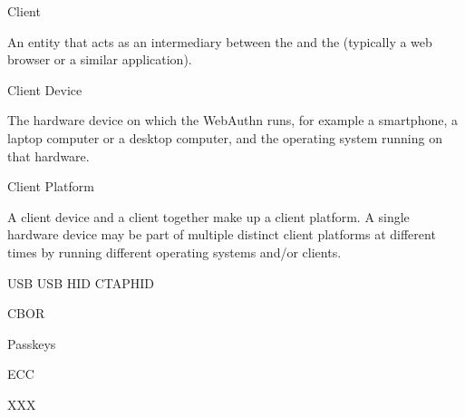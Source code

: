  Client

An entity that acts as an intermediary between the  and the  (typically a web browser or a similar application).


 Client Device

The hardware device on which the WebAuthn  runs, for example a smartphone, a laptop computer or a desktop computer, and the operating system running on that hardware.


 Client Platform

A client device and a client together make up a client platform. A single hardware device may be part of multiple distinct client platforms at different times by running different operating systems and/or clients.


\sec USB
\sec USB HID
\sec CTAPHID

\sec CBOR

\sec Passkeys

\sec ECC

\sec XXX
